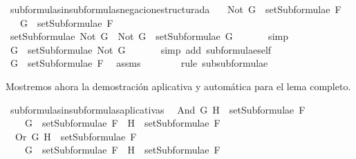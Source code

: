 \begin{isabellebody}
\isamarkupfalse%
%
\endisatagproof
{\isafoldproof}%
%
\isadelimproof
\isanewline
%
\endisadelimproof
\isanewline
{}\isamarkupfalse%
\ subformulas{\isacharunderscore}in{\isacharunderscore}subformulas{\isacharunderscore}negacion{\isacharunderscore}estructurada{\isacharcolon}\isanewline
\ \ \ {\isachardoublequoteopen}Not\ G\ {\isasymin}\ setSubformulae\ F{\isachardoublequoteclose}\isanewline
\ \ \ {\isachardoublequoteopen}G\ {\isasymin}\ setSubformulae\ F{\isachardoublequoteclose}\isanewline
%
\isadelimproof
%
\endisadelimproof
%
\isatagproof
{}\isamarkupfalse%
\ {\isacharminus}\isanewline
\ \ \isamarkupfalse%
\ {\isachardoublequoteopen}setSubformulae\ {\isacharparenleft}Not\ G{\isacharparenright}\ {\isacharequal}\ {\isacharbraceleft}Not\ G{\isacharbraceright}\ {\isasymunion}\ setSubformulae\ G{\isachardoublequoteclose}\ \isanewline
\ \ \ \ \isamarkupfalse%
\ simp\ \isanewline
\ \ \isamarkupfalse%
\ \isamarkupfalse%
\ {}{\isacharcolon}{\isachardoublequoteopen}G\ {\isasymin}\ setSubformulae\ {\isacharparenleft}Not\ G{\isacharparenright}{\isachardoublequoteclose}\ \isanewline
\ \ \ \ \isamarkupfalse%
\ {\isacharparenleft}simp\ add{\isacharcolon}\ subformulae{\isacharunderscore}self{\isacharparenright}\isanewline
\ \ \isamarkupfalse%
\ {\isachardoublequoteopen}G\ {\isasymin}\ setSubformulae\ F{\isachardoublequoteclose}\ \isamarkupfalse%
\ assms\ {}\ \isanewline
\ \ \ \ \isamarkupfalse%
\ {\isacharparenleft}rule\ subsubformulae{\isacharparenright}\isanewline
{}\isamarkupfalse%
%
\endisatagproof
{\isafoldproof}%
%
\isadelimproof
%
\endisadelimproof
%
\begin{isamarkuptext}%
Mostremos ahora la demostración aplicativa y automática para el 
  lema completo.%
\end{isamarkuptext}\isamarkuptrue%
\isamarkupfalse%
\ subformulas{\isacharunderscore}in{\isacharunderscore}subformulas{\isacharunderscore}aplicativa{\isacharunderscore}s{\isacharcolon}\isanewline
\ \ {\isachardoublequoteopen}And\ G\ H\ {\isasymin}\ setSubformulae\ F\ \isanewline
\ \ \ {\isasymLongrightarrow}\ G\ {\isasymin}\ setSubformulae\ F\ {\isasymand}\ H\ {\isasymin}\ setSubformulae\ F{\isachardoublequoteclose}\isanewline
\ \ {\isachardoublequoteopen}Or\ G\ H\ {\isasymin}\ setSubformulae\ F\ \isanewline
\ \ \ {\isasymLongrightarrow}\ G\ {\isasymin}\ setSubformulae\ F\ {\isasymand}\ H\ {\isasymin}\ setSubformulae\ F{\isachardoublequoteclose}\isanewline

\end{isabellebody}
